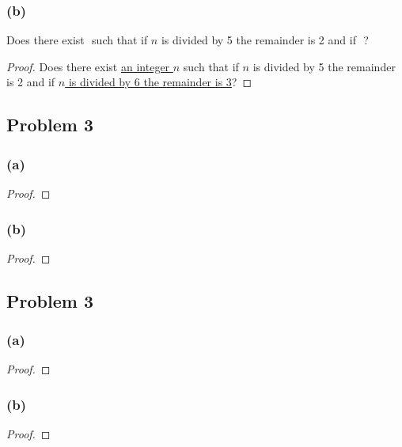 \documentclass[14pt]{extarticle}
\newcommand{\fillBlanks}{\underline{\hspace{1cm}}\,\,}
\begin{document}
\subsubsection{(b)}
Does there exist \fillBlanks such that if $n$ is divided by 5 the remainder is 2 and if \fillBlanks?

\begin{proof}
Does there exist \underline{an integer $n$} such that if $n$ is divided by 5 the remainder is 2 and if \underline{$n$ is divided by 6 the remainder is 3}?
\end{proof}

\subsection{Problem 3}

\subsubsection{(a)}

\begin{proof}
\end{proof}

\subsubsection{(b)}

\begin{proof}
\end{proof}

\subsection{Problem 3}

\subsubsection{(a)}

\begin{proof}
\end{proof}

\subsubsection{(b)}

\begin{proof}
\end{proof}
\end{document}
